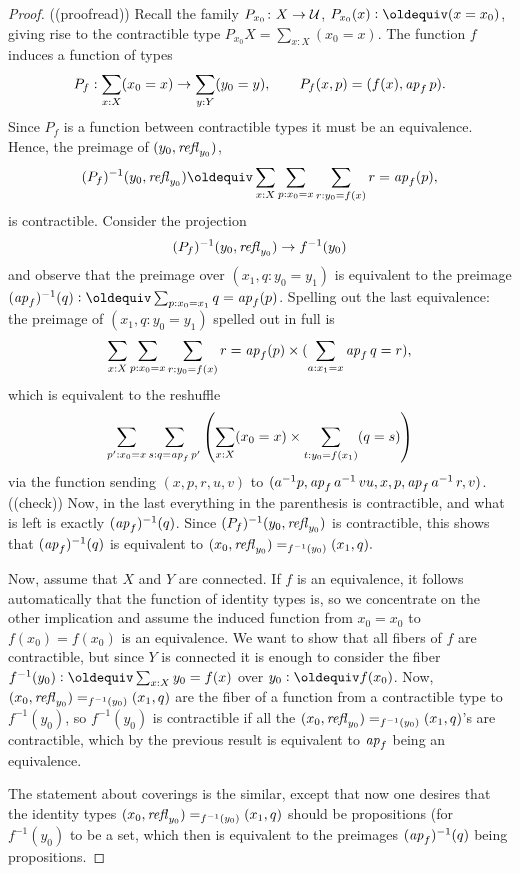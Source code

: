\begin{proof}
((proofread))
  Recall the family $P_{x_0}\colon X\to\mathcal{U}$, $P_{x_0}(x)\defequi (x=x_0)$, giving rise to the contractible type $P_{x_0}X=\sum_{x:X}(x_0=x)$.  The function $f$ induces a function of types 
$$P_f:\sum_{x:X}(x_0=x)\to\sum_{y:Y}(y_0=y),\qquad P_f(x,p)=(f(x),\mathop{{\it ap}_{f}} p).$$  Since $P_f$ is a function between contractible types it must be an equivalence.  Hence, the preimage of $(y_0,\mathop{{\it refl}_{y_0}})$, 
$$(P_f)^{-1}(y_0,\refl{y_0})\oldequiv\sum_{x:X}\sum_{p:x_0=x}\sum_{r:y_0=f(x)}r=\ap f(p),$$  
is contractible.  
Consider the projection 
$$(P_f)^{-1}(y_0,\mathop{{\it refl}_{y_0}})\to f^{-1}(y_0)$$ and observe that the preimage over $(x_1,q:y_0=y_1) $ is equivalent to the preimage $(\ap f)^{-1}(q)\defequi\sum_{p:x_0=x_1}q=\ap f(p)$.  Spelling out the last equivalence: the preimage of $(x_1,q:y_0=y_1) $ spelled out in full is
$$\sum_{x:X}\sum_{p:x_0=x}\sum_{r:y_0=f(x)}r=\mathop{{\it ap}_{f}}(p)\times(\sum_{a:x_1=x}\mathop{{\it ap}_{f}} q=r),$$
which is equivalent to the reshuffle
$$\sum_{p':x_0=x}\sum_{s:q=\mathop{{\it ap}_{f}} p'}\left(\sum_{x:X}(x_0=x)\times\sum_{t:y_0=f(x_1)}(q=s)\right)$$
via the function sending $(x,p,r,u,v)$ to $(a^{-1}p,\mathop{{\it ap}_{f}} a^{-1}\,vu,x,p,\mathop{{\it ap}_{f}} a^{-1}\, r,v)$. ((check))  Now, in the last everything in the parenthesis is contractible, and what is left is exactly $(\mathop{{\it ap}_{f}})^{-1}(q)$.  Since $(P_f)^{-1}(y_0,\mathop{{\it refl}_{y_0}})$ is contractible, this shows that $(\mathop{{\it ap}_{f}})^{-1}(q)$ is equivalent to $(x_0,\mathop{{\it refl}_{y_0}})=_{f^{-1}(y_0)}(x_1,q).$

Now, assume that $X$ and $Y$ are connected.   If $f$ is an equivalence, it follows automatically that the function of identity types is, so we concentrate on the other implication and assume the induced function from $x_0=x_0$ to $f(x_0)=f(x_0)$ is an equivalence.  We want to show that all fibers of $f$ are contractible, but since $Y$ is connected it is enough to consider the fiber $f^{-1}(y_0)\defequi\sum_{x:X}y_0=f(x)$ over $y_0\defequi f(x_0)$.  Now, $(x_0,\mathop{{\it refl}_{y_0}})=_{f^{-1}(y_0)}(x_1,q)$ are the fiber of a function from a contractible type to $f^{-1}(y_0)$, so $f^{-1}(y_0)$ is contractible if all the $(x_0,\mathop{{\it refl}_{y_0}})=_{f^{-1}(y_0)}(x_1,q)$'s are contractible, which by the previous result is equivalent to $\mathop{{\it ap}_{f}}$ being an equivalence.  

The statement about coverings is the similar, except that now one desires that the identity types $(x_0,\mathop{{\it refl}_{y_0}})=_{f^{-1}(y_0)}(x_1,q)$ should be propositions (for $f^{-1}(y_0)$ to be a set, which then is equivalent to the preimages $(\mathop{{\it ap}_{f}})^{-1}(q)$ being propositions.
\end{proof}

